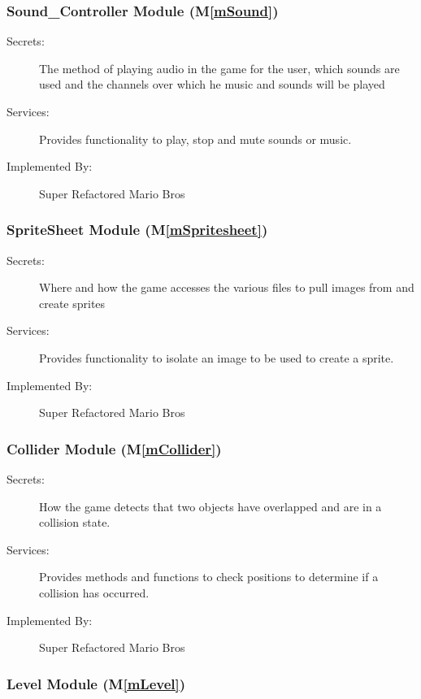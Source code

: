 \documentclass[12pt, titlepage]{article}
\newcommand{\mref}[1]{M\ref{#1}}
\begin{document}
\subsubsection{Sound\_Controller Module (\mref{mSound})}

\begin{description}
\item[Secrets:] The method of playing audio in the game for the user, which sounds are used and the channels over which he music and sounds will be played
\item[Services:] Provides functionality to play, stop and mute sounds or music.
\item[Implemented By:] Super Refactored Mario Bros
\end{description}

\subsubsection{SpriteSheet Module (\mref{mSpritesheet})}

\begin{description}
\item[Secrets:] Where and how the game accesses the various files to pull images from and create sprites
\item[Services:] Provides functionality to isolate an image to be used to create a sprite.
\item[Implemented By:] Super Refactored Mario Bros
\end{description}

\subsubsection{Collider Module (\mref{mCollider})}

\begin{description}
\item[Secrets:] How the game detects that two objects have overlapped and are in a collision state.
\item[Services:] Provides methods and functions to check positions to determine if a collision has occurred.
\item[Implemented By:] Super Refactored Mario Bros
\end{description}

\subsubsection{Level Module (\mref{mLevel})}
\end{document}
